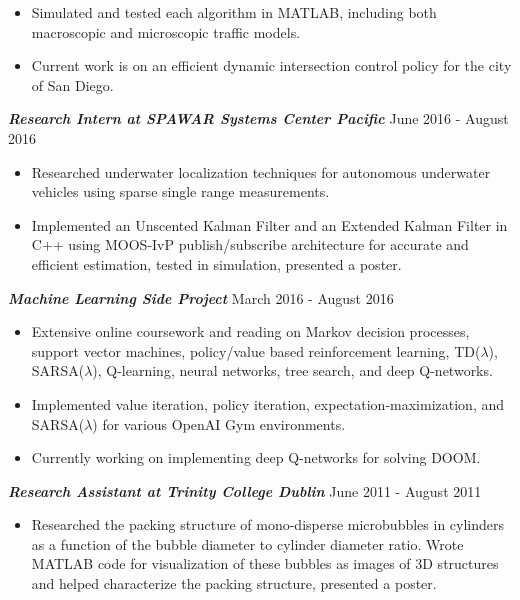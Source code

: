 \documentclass{res}
\begin{document}
\begin{resume}
\begin{itemize}
\item Simulated and tested each algorithm in MATLAB, including both macroscopic and microscopic traffic models.
\vspace*{-.5ex}
\item Current work is on an efficient dynamic intersection control policy for the city of San Diego.
\end{itemize}
\vspace*{-1ex}
{\sl \bf Research Intern at SPAWAR Systems Center Pacific } \hfill June 2016 - August 2016 
\begin{itemize}
\item Researched underwater localization techniques for autonomous underwater vehicles using sparse single range measurements. 
\vspace*{-.5ex}
\item Implemented an Unscented Kalman Filter and an Extended Kalman Filter in C++ using MOOS-IvP publish/subscribe architecture for accurate and efficient estimation, tested in simulation, presented a poster.
\vspace*{-.5ex}
\end{itemize}
\vspace*{-1ex}
\clearpage
{\sl \bf Machine Learning Side Project} \hfill March 2016 - August 2016 
\vspace*{.5ex}
\begin{itemize}
\item Extensive online coursework and reading on Markov decision processes, support vector machines, policy/value based reinforcement learning, TD($\lambda$), SARSA($\lambda$), Q-learning, neural networks, tree search, and deep Q-networks.
\vspace*{-.5ex}
\item Implemented value iteration, policy iteration, expectation-maximization, and SARSA($\lambda$) for various OpenAI Gym environments. 
\vspace*{-.5ex}
\item Currently working on implementing deep Q-networks for solving DOOM.
\end{itemize}
\vspace*{-1ex}
{\sl \bf Research Assistant at Trinity College Dublin} \hfill June 2011 - August 2011
\vspace*{.5ex}
\begin{itemize}
\item Researched the packing structure of mono-disperse microbubbles in cylinders as a function of the bubble diameter to cylinder diameter ratio. Wrote MATLAB code for visualization of these bubbles as images of 3D structures and helped characterize the packing structure, presented a poster.

\end{itemize}
\end{resume}
\end{document}
